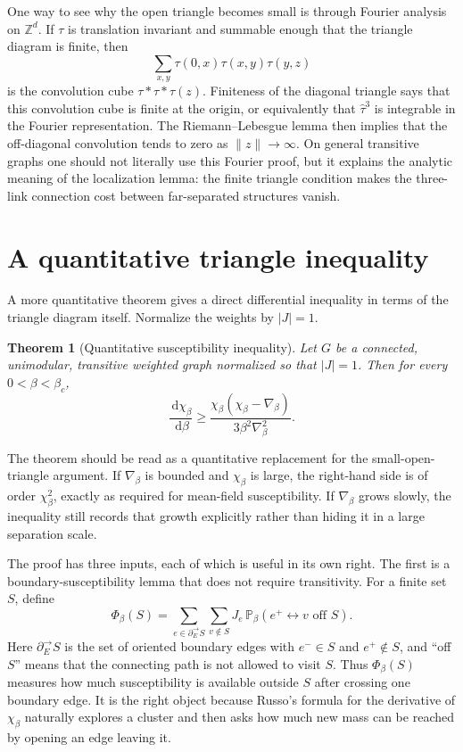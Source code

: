 \documentclass[11pt,reqno]{book}
\numberwithin{equation}{chapter}
\theoremstyle{plain}
\newtheorem{theorem}{Theorem}[chapter]
\theoremstyle{definition}
\theoremstyle{remark}
\newcommand{\Pb}{\mathbb P_\beta}
\newcommand{\Z}{\mathbb Z}
\newcommand{\1}{\mathbf 1}
\newcommand{\norm}[1]{\lVert #1\rVert}
\newcommand{\dd}{\,\mathrm d}
\begin{document}
One way to see why the open triangle becomes small is through Fourier analysis on \(\Z^d\). If \(\tau\) is translation invariant and summable enough that the triangle diagram is finite, then
\[
  \sum_{x,y}\tau(0,x)\tau(x,y)\tau(y,z)
\]
is the convolution cube \(\tau*\tau*\tau(z)\). Finiteness of the diagonal triangle says that this convolution cube is finite at the origin, or equivalently that \(\widehat\tau^3\) is integrable in the Fourier representation. The Riemann--Lebesgue lemma then implies that the off-diagonal convolution tends to zero as \(\norm{z}\to\infty\). On general transitive graphs one should not literally use this Fourier proof, but it explains the analytic meaning of the localization lemma: the finite triangle condition makes the three-link connection cost between far-separated structures vanish.

\section{A quantitative triangle inequality}

A more quantitative theorem gives a direct differential inequality in terms of the triangle diagram itself. Normalize the weights by $|J|=1$.

\begin{theorem}[Quantitative susceptibility inequality]
Let $G$ be a connected, unimodular, transitive weighted graph normalized so that $|J|=1$. Then for every $0<\beta<\beta_c$,
\[
  \frac{\dd\chi_\beta}{\dd\beta}
  \geq
  \frac{\chi_\beta(\chi_\beta-\nabla_\beta)}
       {3\beta^2\nabla_\beta^2}.
\]
\end{theorem}

The theorem should be read as a quantitative replacement for the small-open-triangle argument. If $\nabla_\beta$ is bounded and $\chi_\beta$ is large, the right-hand side is of order $\chi_\beta^2$, exactly as required for mean-field susceptibility. If $\nabla_\beta$ grows slowly, the inequality still records that growth explicitly rather than hiding it in a large separation scale.

The proof has three inputs, each of which is useful in its own right. The first is a boundary-susceptibility lemma that does not require transitivity. For a finite set $S$, define
\[
  \Phi_\beta(S)
  =
  \sum_{e\in\partial_E^\rightarrow S}
  \sum_{v\notin S}
  J_e\,\Pb(e^+\leftrightarrow v\text{ off }S).
\]
Here $\partial_E^\rightarrow S$ is the set of oriented boundary edges with $e^-\in S$ and $e^+\notin S$, and ``off \(S\)'' means that the connecting path is not allowed to visit \(S\). Thus $\Phi_\beta(S)$ measures how much susceptibility is available outside \(S\) after crossing one boundary edge. It is the right object because Russo's formula for the derivative of \(\chi_\beta\) naturally explores a cluster and then asks how much new mass can be reached by opening an edge leaving it.
\end{document}
